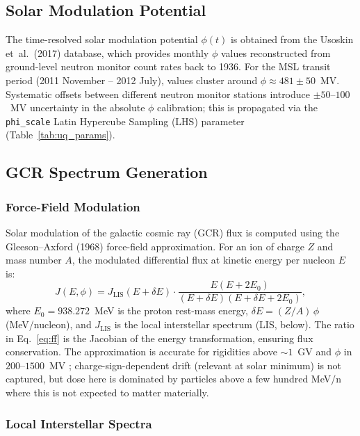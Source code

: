 \documentclass[a4paper,fleqn]{cas-sc}
\newcommand{\code}[1]{\texttt{#1}}
\begin{document}
\subsection{Solar Modulation Potential}

The time-resolved solar modulation potential $\phi(t)$ is obtained from the
Usoskin et~al.\ (2017) database, which provides monthly $\phi$ values
reconstructed from ground-level neutron monitor count rates back to 1936.
For the MSL transit period (2011 November -- 2012 July), values cluster
around $\phi \approx 481 \pm 50$~MV. Systematic offsets between different
neutron monitor stations introduce $\pm 50$--$100$~MV uncertainty in the
absolute $\phi$ calibration; this is propagated via the \code{phi\_scale}
Latin Hypercube Sampling (LHS) parameter (Table~\ref{tab:uq_params}).

\subsection{GCR Spectrum Generation}

\subsubsection{Force-Field Modulation}

Solar modulation of the galactic cosmic ray (GCR) flux is computed using
the Gleeson--Axford (1968)
force-field approximation. For an ion of charge $Z$ and mass number $A$, the
modulated differential flux at kinetic energy per nucleon $E$ is:
\begin{equation}
  J(E, \phi) = J_\mathrm{LIS}(E + \delta E)
  \cdot \frac{E(E + 2E_0)}{(E + \delta E)(E + \delta E + 2E_0)},
  \label{eq:ff}
\end{equation}
where $E_0 = 938.272$~MeV is the proton rest-mass energy,
$\delta E = (Z/A)\,\phi$ (MeV/nucleon), and $J_\mathrm{LIS}$ is the local
interstellar spectrum (LIS, below). The ratio in Eq.~\eqref{eq:ff} is the
Jacobian of the energy transformation, ensuring flux conservation. The
approximation is accurate for rigidities above $\sim\!1$~GV and $\phi$ in
$200$--$1500$~MV \citep{potgieter2013}; charge-sign-dependent drift (relevant
at solar minimum) is not captured, but dose here is dominated by particles
above a few hundred MeV/n where this is not expected to matter materially.

\subsubsection{Local Interstellar Spectra}
\end{document}

